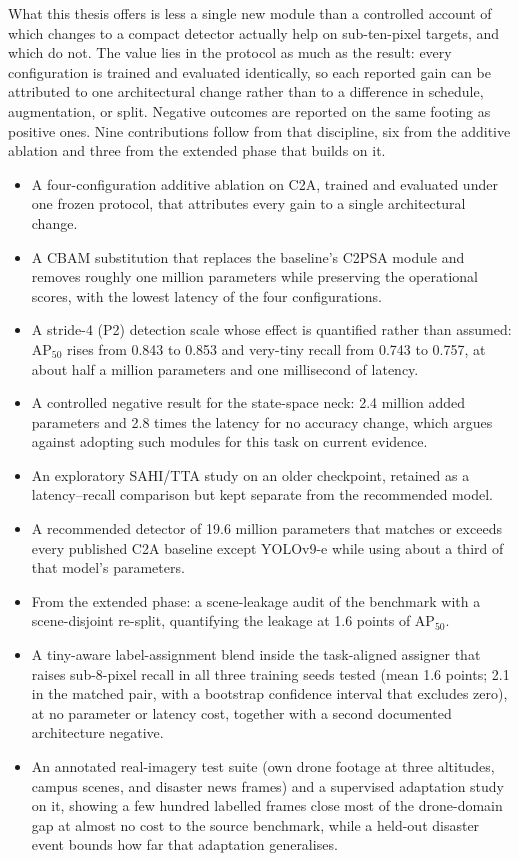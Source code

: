 \documentclass[12pt,a4paper,oneside]{report}
\begin{document}
What this thesis offers is less a single new module than a controlled account of
which changes to a compact detector actually help on sub-ten-pixel targets, and
which do not. The value lies in the protocol as much as the result: every
configuration is trained and evaluated identically, so each reported gain can be
attributed to one architectural change rather than to a difference in schedule,
augmentation, or split. Negative outcomes are reported on the same footing as
positive ones. Nine contributions follow from that discipline, six from the
additive ablation and three from the extended phase that builds on it.

\begin{itemize}
  \item A four-configuration additive ablation on C2A, trained and evaluated
        under one frozen protocol, that attributes every gain to a single
        architectural change.
  \item A CBAM substitution that replaces the baseline's C2PSA module and
        removes roughly one million parameters while preserving the
        operational scores, with the lowest latency of the four configurations.
  \item A stride-4 (P2) detection scale whose effect is quantified rather
        than assumed: $\mathrm{AP}_{50}$ rises from 0.843 to 0.853 and
        very-tiny recall from 0.743 to 0.757, at about half a million
        parameters and one millisecond of latency.
  \item A controlled negative result for the state-space neck: 2.4 million
        added parameters and 2.8 times the latency for no accuracy change,
        which argues against adopting such modules for this task on current
        evidence.
  \item An exploratory SAHI/TTA study on an older checkpoint, retained as a
        latency--recall comparison but kept separate from the recommended model.
  \item A recommended detector of 19.6 million parameters that matches or
        exceeds every published C2A baseline except YOLOv9-e while using
        about a third of that model's parameters.
  \item From the extended phase: a scene-leakage audit of the benchmark with
        a scene-disjoint re-split, quantifying the leakage at 1.6 points of
        $\mathrm{AP}_{50}$.
  \item A tiny-aware label-assignment blend inside the task-aligned assigner
        that raises sub-8-pixel recall in all three training seeds tested
        (mean 1.6 points; 2.1 in the matched pair, with a bootstrap
        confidence interval that excludes zero), at no parameter or latency
        cost, together with a second documented architecture negative.
  \item An annotated real-imagery test suite (own drone footage at three
        altitudes, campus scenes, and disaster news frames) and a supervised
        adaptation study on it, showing a few hundred labelled frames close
        most of the drone-domain gap at almost no cost to the source
        benchmark, while a held-out disaster event bounds how far that
        adaptation generalises.
\end{itemize}
\end{document}
